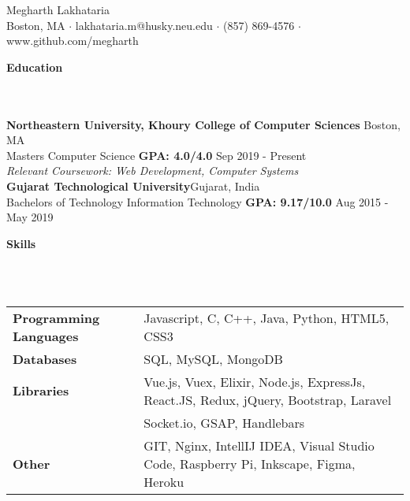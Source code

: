 \documentclass[]{article}
\newcommand{\lineunder} {
    \vspace*{-8pt} \\
    \hrulefill \\
}
\newcommand{\header} [1] {
    {\vspace*{6pt} \fontsize{12}{12}\selectfont \textbf{#1}}
     \lineunder
}
\begin{document}
\vspace*{-40pt}

    

\begin{center}
	{\LARGE {Megharth Lakhataria}}\\
	Boston, MA $\cdot$ lakhataria.m@husky.neu.edu $\cdot$ (857) 869-4576 $\cdot$ www.github.com/megharth\\
\end{center}

\header{Education}
\hspace{1mm}
\textbf{Northeastern University, Khoury College of Computer Sciences}
\hfill
Boston, MA\\
\hspace{1mm}
Masters Computer Science \textbf{GPA: 4.0/4.0} \hfill Sep 2019 - Present\\
\hspace{1mm}
\textit{Relevant Coursework: Web Development, Computer Systems} \\
\vspace{2mm}
\hspace{1mm}
\textbf{Gujarat Technological University}\hfill Gujarat, India\\
\hspace{1mm}
Bachelors of Technology Information Technology \textbf{GPA: 9.17/10.0} \hfill
Aug 2015 - May 2019\\
\vspace{2mm}


\header{Skills}
\vspace{1mm}
\begin{tabular}{ l l }
	\textbf{Programming Languages} & Javascript, C, C++, Java, Python, HTML5, CSS3            \\
	\textbf{Databases}             & SQL, MySQL, MongoDB                                      \\
    
    \textbf{Libraries}             & Vue.js, Vuex, Elixir, Node.js, ExpressJs, React.JS,
    Redux, jQuery, Bootstrap, Laravel  \\
                          & Socket.io, GSAP, Handlebars \\
    
    \textbf{Other}                & GIT, Nginx, IntellIJ IDEA, Visual Studio Code,
    Raspberry Pi, Inkscape, Figma, Heroku \\          
\end{tabular}
\vspace{2mm}
\end{document}
